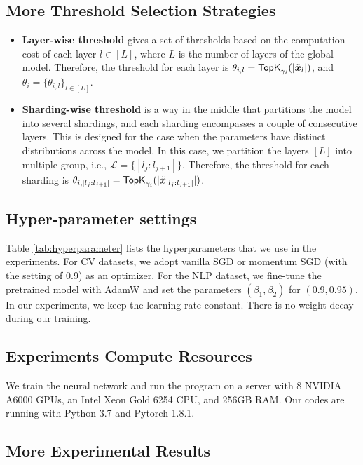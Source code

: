 \documentclass{article}
\theoremstyle{plain}
\theoremstyle{definition}
\theoremstyle{remark}
\begin{document}
\subsection{More Threshold Selection Strategies} \label{appendix:threshold}

\begin{itemize}[leftmargin=1em]
    \item \textbf{Layer-wise threshold} gives a set of thresholds based on the computation cost of each layer $l \in [L]$, where $L$ is the number of layers of the global model. Therefore, the threshold for each layer is $\theta_{i, l} = \textsf{TopK}_{\gamma_i}(|\x{l}|)$, and $\theta_i = \{\theta_{i, l}\}_{l \in [L]}$. 
    \item \textbf{Sharding-wise threshold} is a  way in the middle that partitions the model into several shardings, and each sharding encompasses a couple of consecutive layers. This is designed for the case when the parameters have distinct distributions across the model. In this case, we partition the layers $[L]$ into multiple group, i.e., $\mathcal{L} = \{[l_j:l_{j+1}]\}$. Therefore, the threshold for each sharding is $\theta_{i, [l_j: l_{j+1}]} = \textsf{TopK}_{\gamma_i}(|\x{[l_j: l_{j+1}]}|)$. 
\end{itemize}



\subsection{Hyper-parameter settings} \label{appendix:experiments_setup}
Table \ref{tab:hyperparameter} lists the hyperparameters that we use in the experiments. For CV datasets, we adopt vanilla SGD or momentum SGD (with the setting of 0.9) as an optimizer. For the NLP dataset, we fine-tune the pretrained model with AdamW and set the parameters $(\beta_1, \beta_2)$ for $(0.9, 0.95)$. In our experiments, we keep the learning rate constant. There is no weight decay during our training. 


\subsection{Experiments Compute Resources}  \label{appendix:compute_resource}

We train the neural network and run the program on a server with 8 NVIDIA A6000 GPUs, an Intel Xeon Gold 6254 CPU, and 256GB RAM. Our codes are running with Python 3.7 and Pytorch 1.8.1. 

\subsection{More Experimental Results}
\end{document}
